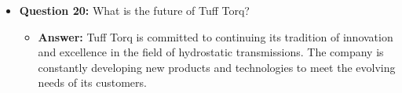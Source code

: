 \documentclass{article}
\begin{document}
\begin{itemize}
    \item \textbf{Question 20:} What is the future of Tuff Torq?
    \begin{itemize}
        \item \textbf{Answer:} Tuff Torq is committed to continuing its tradition of innovation and excellence in the field of hydrostatic transmissions. The company is constantly developing new products and technologies to meet the evolving needs of its customers.
    \end{itemize}
\end{itemize}
\end{document}
